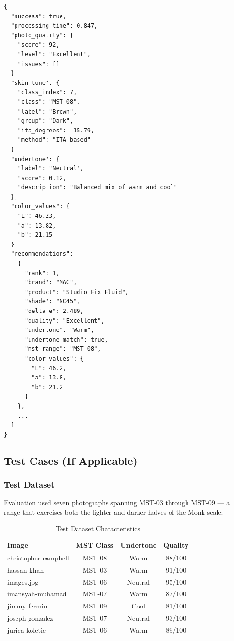 \begin{verbatim}
{
  "success": true,
  "processing_time": 0.847,
  "photo_quality": {
    "score": 92,
    "level": "Excellent",
    "issues": []
  },
  "skin_tone": {
    "class_index": 7,
    "class": "MST-08",
    "label": "Brown",
    "group": "Dark",
    "ita_degrees": -15.79,
    "method": "ITA_based"
  },
  "undertone": {
    "label": "Neutral",
    "score": 0.12,
    "description": "Balanced mix of warm and cool"
  },
  "color_values": {
    "L": 46.23,
    "a": 13.82,
    "b": 21.15
  },
  "recommendations": [
    {
      "rank": 1,
      "brand": "MAC",
      "product": "Studio Fix Fluid",
      "shade": "NC45",
      "delta_e": 2.489,
      "quality": "Excellent",
      "undertone": "Warm",
      "undertone_match": true,
      "mst_range": "MST-08",
      "color_values": {
        "L": 46.2,
        "a": 13.8,
        "b": 21.2
      }
    },
    ...
  ]
}
\end{verbatim}

\subsection{Test Cases (If Applicable)}

\subsubsection{Test Dataset}

Evaluation used seven photographs spanning MST-03 through MST-09 — a range that exercises both the lighter and darker halves of the Monk scale:

\begin{table}[h]
\centering
\small
\begin{tabular}{|l|c|c|c|}
\hline
\textbf{Image} & \textbf{MST Class} & \textbf{Undertone} & \textbf{Quality} \\
\hline
christopher-campbell & MST-08 & Warm & 88/100 \\
hassan-khan & MST-03 & Warm & 91/100 \\
images.jpg & MST-06 & Neutral & 95/100 \\
imansyah-muhamad & MST-07 & Warm & 87/100 \\
jimmy-fermin & MST-09 & Cool & 81/100 \\
joseph-gonzalez & MST-07 & Neutral & 93/100 \\
jurica-koletic & MST-06 & Warm & 89/100 \\
\hline
\end{tabular}
\caption{Test Dataset Characteristics}
\end{table}

